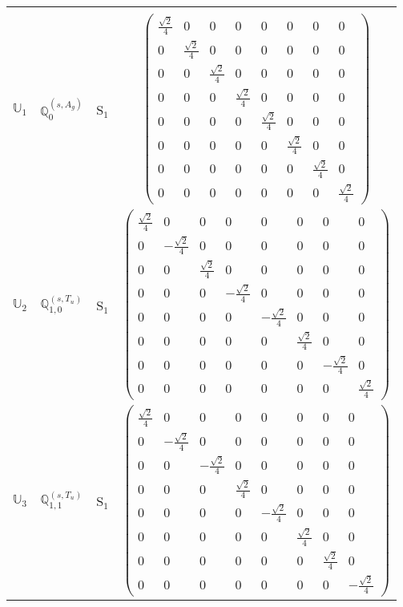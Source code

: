 \documentclass[fleqn,10pt,landscape]{article}
\begin{document}
\begin{itemize}
\begin{center}
\begin{longtable}{c|c|c|c}
 \hline \hline
\multicolumn{3}{r}{} \\ \endlastfoot

$ \mathbb{U}_{1} $ & $\mathbb{Q}_{0}^{(s,A_{g})}$ & S$_{1}$ & $\begin{pmatrix} \frac{\sqrt{2}}{4} & 0 & 0 & 0 & 0 & 0 & 0 & 0 \\ 0 & \frac{\sqrt{2}}{4} & 0 & 0 & 0 & 0 & 0 & 0 \\ 0 & 0 & \frac{\sqrt{2}}{4} & 0 & 0 & 0 & 0 & 0 \\ 0 & 0 & 0 & \frac{\sqrt{2}}{4} & 0 & 0 & 0 & 0 \\ 0 & 0 & 0 & 0 & \frac{\sqrt{2}}{4} & 0 & 0 & 0 \\ 0 & 0 & 0 & 0 & 0 & \frac{\sqrt{2}}{4} & 0 & 0 \\ 0 & 0 & 0 & 0 & 0 & 0 & \frac{\sqrt{2}}{4} & 0 \\ 0 & 0 & 0 & 0 & 0 & 0 & 0 & \frac{\sqrt{2}}{4} \end{pmatrix}$ \\
$ \mathbb{U}_{2} $ & $\mathbb{Q}_{1,0}^{(s,T_{u})}$ & S$_{1}$ & $\begin{pmatrix} \frac{\sqrt{2}}{4} & 0 & 0 & 0 & 0 & 0 & 0 & 0 \\ 0 & - \frac{\sqrt{2}}{4} & 0 & 0 & 0 & 0 & 0 & 0 \\ 0 & 0 & \frac{\sqrt{2}}{4} & 0 & 0 & 0 & 0 & 0 \\ 0 & 0 & 0 & - \frac{\sqrt{2}}{4} & 0 & 0 & 0 & 0 \\ 0 & 0 & 0 & 0 & - \frac{\sqrt{2}}{4} & 0 & 0 & 0 \\ 0 & 0 & 0 & 0 & 0 & \frac{\sqrt{2}}{4} & 0 & 0 \\ 0 & 0 & 0 & 0 & 0 & 0 & - \frac{\sqrt{2}}{4} & 0 \\ 0 & 0 & 0 & 0 & 0 & 0 & 0 & \frac{\sqrt{2}}{4} \end{pmatrix}$ \\
$ \mathbb{U}_{3} $ & $\mathbb{Q}_{1,1}^{(s,T_{u})}$ & S$_{1}$ & $\begin{pmatrix} \frac{\sqrt{2}}{4} & 0 & 0 & 0 & 0 & 0 & 0 & 0 \\ 0 & - \frac{\sqrt{2}}{4} & 0 & 0 & 0 & 0 & 0 & 0 \\ 0 & 0 & - \frac{\sqrt{2}}{4} & 0 & 0 & 0 & 0 & 0 \\ 0 & 0 & 0 & \frac{\sqrt{2}}{4} & 0 & 0 & 0 & 0 \\ 0 & 0 & 0 & 0 & - \frac{\sqrt{2}}{4} & 0 & 0 & 0 \\ 0 & 0 & 0 & 0 & 0 & \frac{\sqrt{2}}{4} & 0 & 0 \\ 0 & 0 & 0 & 0 & 0 & 0 & \frac{\sqrt{2}}{4} & 0 \\ 0 & 0 & 0 & 0 & 0 & 0 & 0 & - \frac{\sqrt{2}}{4} \end{pmatrix}$ \\

\end{longtable}
\end{center}
\end{itemize}
\end{document}

